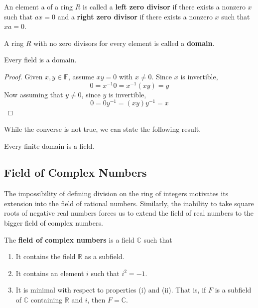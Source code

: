     \begin{definition}
      An element a of a ring $R$ is called a \textbf{left zero divisor} if there exists a nonzero $x$ such that $a x = 0$ and a \textbf{right zero divisor} if there exists a nonzero $x$ such that $x a = 0$. 
    \end{definition}

    \begin{definition}
      A ring $R$ with no zero divisors for every element is called a \textbf{domain}. 
    \end{definition}

    \begin{proposition}
      Every field is a domain. 
    \end{proposition}
    \begin{proof}
      Given $x, y \in \mathbb{F}$, assume $x y = 0$ with $x \neq 0$. Since $x$ is invertible,
      \begin{equation}
        0 = x^{-1} 0 = x^{-1} (x y) = y
      \end{equation}
      Now assuming that $y \neq 0$, since $y$ is invertible, 
      \begin{equation}
        0 = 0 y^{-1} = (x y) y^{-1} = x
      \end{equation}
    \end{proof}

    While the converse is not true, we can state the following result. 

    \begin{theorem}
      Every finite domain is a field. 
    \end{theorem}

  \subsection{Field of Complex Numbers}

    The impossibility of defining division on the ring of integers motivates its extension into the field of rational numbers. Similarly, the inability to take square roots of negative real numbers forces us to extend the field of real numbers to the bigger field of complex numbers. 

    \begin{definition}
      The \textbf{field of complex numbers} is a field $\mathbb{C}$ such that 
      \begin{enumerate}
        \item It contains the field $\mathbb{R}$ as a subfield. 
        \item It contains an element $i$ such that $i^2 = -1$.
        \item It is minimal with respect to properties (i) and (ii). That is, if $F$ is a subfield of $\mathbb{C}$ containing $\mathbb{R}$ and $i$, then $F = \mathbb{C}$. 
      \end{enumerate}
    \end{definition}

